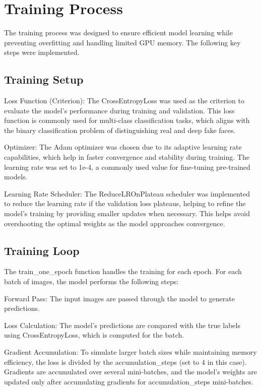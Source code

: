 \documentclass[12pt]{article}
\begin{document}
    \section{Training Process}\label{training-process}

The training process was designed to ensure efficient model learning
while preventing overfitting and handling limited GPU memory. The
following key steps were implemented.

    \subsection{Training Setup}\label{training-setup}

    Loss Function (Criterion): The CrossEntropyLoss was used as the
criterion to evaluate the model's performance during training and
validation. This loss function is commonly used for multi-class
classification tasks, which aligns with the binary classification
problem of distinguishing real and deep fake faces.

Optimizer: The Adam optimizer was chosen due to its adaptive learning
rate capabilities, which help in faster convergence and stability during
training. The learning rate was set to 1e-4, a commonly used value for
fine-tuning pre-trained models.

Learning Rate Scheduler: The ReduceLROnPlateau scheduler was implemented
to reduce the learning rate if the validation loss plateaus, helping to
refine the model's training by providing smaller updates when necessary.
This helps avoid overshooting the optimal weights as the model
approaches convergence.

    \subsection{Training Loop}\label{training-loop}

    The train\_one\_epoch function handles the training for each epoch. For
each batch of images, the model performs the following steps:

Forward Pass: The input images are passed through the model to generate
predictions.

Loss Calculation: The model's predictions are compared with the true
labels using CrossEntropyLoss, which is computed for the batch.

Gradient Accumulation: To simulate larger batch sizes while maintaining
memory efficiency, the loss is divided by the accumulation\_steps (set
to 4 in this case). Gradients are accumulated over several mini-batches,
and the model's weights are updated only after accumulating gradients
for accumulation\_steps mini-batches.
\end{document}
